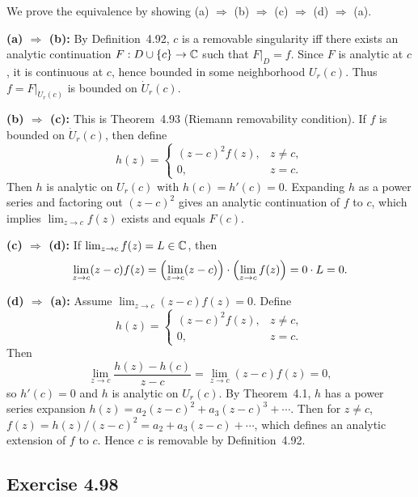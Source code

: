 \documentclass{article}
\begin{document}
\begin{solution}
  We prove the equivalence by showing (a) $\Rightarrow$ (b) $\Rightarrow$ (c) $\Rightarrow$ (d) $\Rightarrow$ (a).

  \medskip
  \noindent\textbf{(a) $\Rightarrow$ (b):}
  By Definition~4.92, $c$ is a removable singularity iff there exists an analytic
  continuation $F : D \cup \{c\} \to \mathbb{C}$ such that $F|_D = f$.
  Since $F$ is analytic at $c$, it is continuous at $c$, hence bounded in some
  neighborhood $U_r(c)$. Thus $f = F|_{\dot{U}_r(c)}$ is bounded on $\dot{U}_r(c)$.

  \medskip
  \noindent\textbf{(b) $\Rightarrow$ (c):}
  This is Theorem~4.93 (Riemann removability condition). If $f$ is bounded on
  $\dot{U}_r(c)$, then define
  \[
    h(z) =
    \begin{cases}
      (z - c)^2 f(z), & z \ne c,\\
      0, & z = c.
    \end{cases}
  \]
  Then $h$ is analytic on $U_r(c)$ with $h(c) = h'(c) = 0$. Expanding $h$ as a
  power series and factoring out $(z-c)^2$ gives an analytic continuation of $f$
  to $c$, which implies $\lim_{z \to c} f(z)$ exists and equals $F(c)$.

  \medskip
  \noindent\textbf{(c) $\Rightarrow$ (d):}
  If $\lim_{z \to c} f(z) = L \in \mathbb{C}$, then
  \[
    \lim_{z \to c} (z - c)f(z) = \Bigl(\lim_{z \to c} (z-c)\Bigr) \cdot
    \Bigl(\lim_{z \to c} f(z)\Bigr) = 0 \cdot L = 0.
  \]

  \medskip
  \noindent\textbf{(d) $\Rightarrow$ (a):}
  Assume $\lim_{z \to c} (z-c)f(z) = 0$. Define
  \[
    h(z) =
    \begin{cases}
      (z - c)^2 f(z), & z \ne c,\\
      0, & z = c.
    \end{cases}
  \]
  Then
  \[
    \lim_{z \to c} \frac{h(z) - h(c)}{z - c} = \lim_{z \to c} (z-c)f(z) = 0,
  \]
  so $h'(c) = 0$ and $h$ is analytic on $U_r(c)$. By Theorem~4.1, $h$ has a
  power series expansion $h(z) = a_2(z-c)^2 + a_3(z-c)^3 + \cdots$. Then for
  $z \ne c$, $f(z) = h(z)/(z-c)^2 = a_2 + a_3(z-c) + \cdots$, which defines
  an analytic extension of $f$ to $c$. Hence $c$ is removable by Definition~4.92.
\end{solution}

\subsection{Exercise 4.98}
\end{document}
